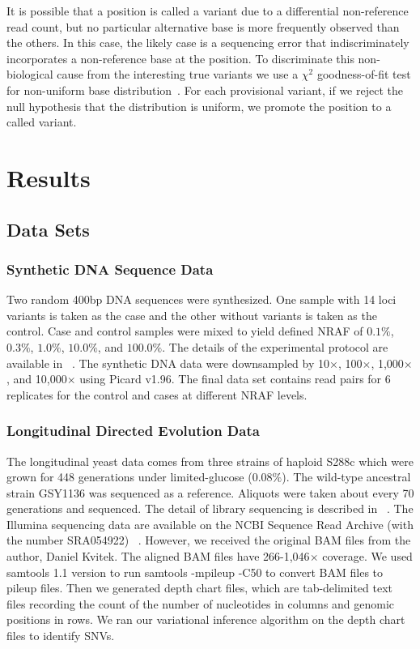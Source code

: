 \documentclass[11pt,reqno]{amsart}
\begin{document}
It is possible that a position is called a variant due to a differential non-reference read count, but no particular alternative base is more frequently observed than the others.
In this case, the likely case is a sequencing error that indiscriminately incorporates a non-reference base at the position.
To discriminate this non-biological cause from the interesting true variants we use a $\chi^2$ goodness-of-fit test for non-uniform base distribution~\citep{efron2010large, he2015rvd2}.
For each provisional variant, if we reject the null hypothesis that the distribution is uniform, we promote the position to a called variant.


\section{Results}
\subsection{Data Sets}
\subsubsection{Synthetic DNA Sequence Data}
Two random 400bp DNA sequences were synthesized. One sample with 14 loci variants is taken as the case and the other without variants is taken as the control.
Case and control samples were mixed to yield defined NRAF of $0.1\%$, $0.3\%$, $1.0\%$, $10.0\%$, and $100.0\%$.
The details of the experimental protocol are available in ~\citep{flaherty2011ultrasensitive}.
The synthetic DNA data were downsampled by 10$\times$, 100$\times$, 1,000$\times$, and 10,000$\times$ using Picard v1.96.
The final data set contains read pairs for 6 replicates for the control and cases at different NRAF levels.
\subsubsection{Longitudinal Directed Evolution Data}
The longitudinal yeast data comes from three strains of haploid S288c which were grown for 448 generations under limited-glucose (0.08$\%$).
The wild-type ancestral strain GSY1136 was sequenced as a reference.
Aliquots were taken about every 70 generations and sequenced.
The detail of library sequencing is described in ~\citep{kvitek2013whole, kao2008molecular}.
The Illumina sequencing data are available on the NCBI Sequence Read Archive (with the number SRA054922) ~\citep{kvitek2013whole}.
However, we received the original BAM files from the author, Daniel Kvitek.
The aligned BAM files have 266-1,046$\times$ coverage.
We used samtools 1.1 version to run samtools -mpileup -C50 to convert BAM files to pileup files.
Then we generated depth chart files, which are tab-delimited text files recording the count of the number of nucleotides in columns and genomic positions in rows.
We ran our variational inference algorithm on the depth chart files to identify SNVs.
\end{document}
